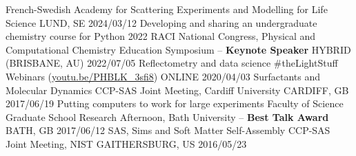 \begin{dayenumerate}
    {French-Swedish Academy for Scattering Experiments and Modelling for Life Science}
    {LUND, SE}
    {2024/03/12}
  \cvpresentation
    {Developing and sharing an undergraduate chemistry course for Python}
    {2022 RACI National Congress, Physical and Computational Chemistry Education Symposium -- \textbf{Keynote Speaker}}
    {HYBRID (BRISBANE, AU)}
    {2022/07/05}
  \cvpresentation
    {Reflectometry and data science}
    {\#theLightStuff Webinars (\href{https://youtu.be/PHBLK_3sfi8}{youtu.be/PHBLK\_3sfi8})}
    {ONLINE}
    {2020/04/03}
  \cvpresentation
    {Surfactants and Molecular Dynamics}
    {CCP-SAS Joint Meeting, Cardiff University}
    {CARDIFF, GB}
    {2017/06/19}
  \cvpresentation
    {Putting computers to work for large experiments}
    {Faculty of Science Graduate School Research Afternoon, Bath University -- \textbf{Best Talk Award}}
    {BATH, GB}
    {2017/06/12}
  \cvpresentation
    {SAS, Sims and Soft Matter Self-Assembly}
    {CCP-SAS Joint Meeting, NIST}
    {GAITHERSBURG, US}
    {2016/05/23}
\end{dayenumerate}\vspace{-0.5cm}
